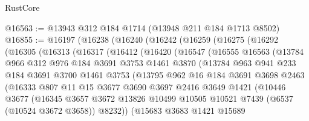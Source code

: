 \begin{lexlean}{RustCore}
\begin{coremodule}
@16563 := @13943 @312 @184 @1714 (@13948 @211 @184 @1713 @8502)
@16855 := @16197
    (@16238
      (@16240
        (@16242
          (@16259
            (@16275
              (@16292
                (@16305
                  (@16313
                    (@16317
                      (@16412
                        (@16420
                          (@16547
                            (@16555
                              @16563
                              (@13784
                                @966
                                @312
                                @976
                                @184
                                @3691
                                @3753
                                @1461
                                @3870
                                (@13784
                                  @963
                                  @941
                                  @233
                                  @184
                                  @3691
                                  @3700
                                  @1461
                                  @3753
                                  (@13795
                                    @962
                                    @16
                                    @184
                                    @3691
                                    @3698
                                    @2463
                                    (@16333
                                      @807
                                      @11
                                      @15
                                      @3677
                                      @3690
                                      @3697
                                      @2416
                                      @3649
                                      @1421
                                      (@10446
                                        @3677
                                        (@16345
                                          @3657
                                          @3672
                                          @13826
                                          @10499
                                          @10505
                                          @10521
                                          @7439
                                          (@6537 (@10524 @3672 @3658))
                                          @8232))
                                      (@15683
                                        @3683
                                        @1421
                                        @15689

\end{coremodule}
\end{lexlean}
